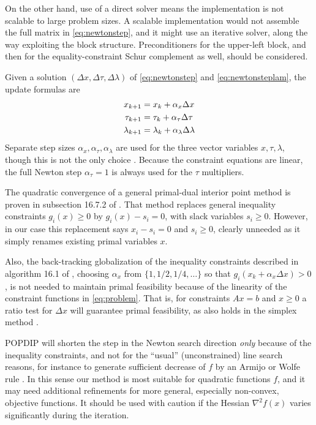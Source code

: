 \documentclass[11pt]{article}
\newcommand{\grad}{\nabla}
\begin{document}
On the other hand, use of a direct solver means the implementation is not scalable to large problem sizes.  A scalable implementation would not assemble the full matrix in \eqref{eq:newtonstep}, and it might use an iterative solver, along the way exploiting the block structure.  Preconditioners \cite{Bueler2021,TrefethenBau1997} for the upper-left block, and then for the equality-constraint Schur complement \cite[chapters 14]{Bueler2021} as well, should be considered.

Given a solution $(\Delta x,\Delta\tau,\Delta\lambda)$ of \eqref{eq:newtonstep} and \eqref{eq:newtonsteplam}, the update formulas are
\begin{align}
x_{k+1} &= x_k + \alpha_x \Delta x \label{eq:updates} \\
\tau_{k+1} &= \tau_k + \alpha_\tau \Delta \tau \notag \\
\lambda_{k+1} &= \lambda_k + \alpha_\lambda \Delta \lambda \notag
\end{align}
Separate step sizes $\alpha_x,\alpha_\tau,\alpha_\lambda$ are used for the three vector variables $x,\tau,\lambda$, though this is not the only choice \cite{YamashitaYabe1996}.  Because the constraint equations are linear, the full Newton step $\alpha_\tau=1$ is always used for the $\tau$ multipliers.

The quadratic convergence of a general primal-dual interior point method is proven in subsection 16.7.2 of \cite{GrivaNashSofer2009}.  That method replaces general inequality constraints $g_i(x)\ge 0$ by $g_i(x) - s_i =0$, with slack variables $s_i\ge 0$.  However, in our case this replacement says $x_i-s_i=0$ and $s_i\ge 0$, clearly unneeded as it simply renames existing primal variables $x$.

Also, the back-tracking globalization of the inequality constraints described in algorithm 16.1 of \cite{GrivaNashSofer2009}, choosing $\alpha_x$ from $\{1,1/2,1/4,\dots\}$ so that $g_i(x_k + \alpha_x \Delta x) > 0$, is not needed to maintain primal feasibility because of the linearity of the constraint functions in \eqref{eq:problem}.  That is, for constraints $Ax=b$ and $x\ge 0$ a ratio test for $\Delta x$ will guarantee primal feasibility, as also holds in the simplex method \cite[chapter 5]{GrivaNashSofer2009}.

POPDIP will shorten the step in the Newton search direction \emph{only} because of the inequality constraints, and not for the ``usual'' (unconstrained) line search reasons, for instance to generate sufficient decrease of $f$ by an Armijo or Wolfe rule \cite[section 11.5]{GrivaNashSofer2009}.  In this sense our method is most suitable for quadratic functions $f$, and it may need additional refinements for more general, especially non-convex, objective functions.  It should be used with caution if the Hessian $\grad^2 f(x)$ varies significantly during the iteration.
\end{document}

